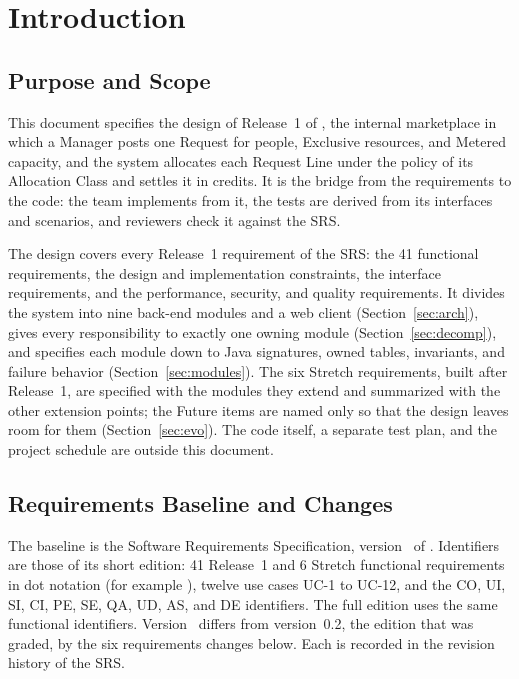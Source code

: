 \section{Introduction}\label{sec:intro}

\subsection{Purpose and Scope}

This document specifies the design of Release~1 of \SRSproduct{}, the internal marketplace in which a Manager posts one Request for people, Exclusive resources, and Metered capacity, and the system allocates each Request Line under the policy of its Allocation Class and settles it in credits. It is the bridge from the requirements to the code: the team implements from it, the tests are derived from its interfaces and scenarios, and reviewers check it against the SRS.

The design covers every Release~1 requirement of the SRS: the 41 functional requirements, the design and implementation constraints, the interface requirements, and the performance, security, and quality requirements. It divides the system into nine back-end modules and a web client (Section~\ref{sec:arch}), gives every responsibility to exactly one owning module (Section~\ref{sec:decomp}), and specifies each module down to Java signatures, owned tables, invariants, and failure behavior (Section~\ref{sec:modules}). The six Stretch requirements, built after Release~1, are specified with the modules they extend and summarized with the other extension points; the Future items are named only so that the design leaves room for them (Section~\ref{sec:evo}). The code itself, a separate test plan, and the project schedule are outside this document.

\subsection{Requirements Baseline and Changes}

The baseline is the \SRSproduct{} Software Requirements Specification, version~\SRSversion{} of \SRSdate{}. Identifiers are those of its short edition: 41 Release~1 and 6 Stretch functional requirements in dot notation (for example ), twelve use cases UC-1 to UC-12, and the CO, UI, SI, CI, PE, SE, QA, UD, AS, and DE identifiers. The full edition uses the same functional identifiers. Version~\SRSversion{} differs from version~0.2, the edition that was graded, by the six requirements changes below. Each is recorded in the revision history of the SRS.

